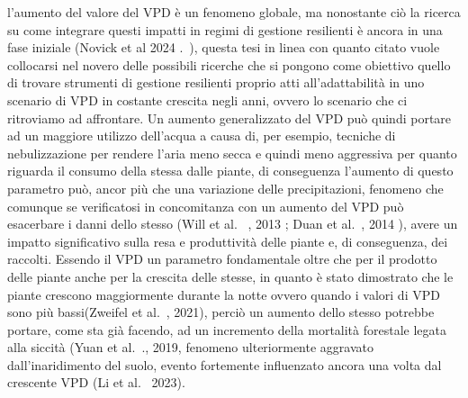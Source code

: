 l'aumento del valore del VPD è un fenomeno globale, ma nonostante ciò la ricerca su come integrare questi impatti in regimi di gestione resilienti è ancora in una fase iniziale (Novick et al 2024 .~\cite{novick2024vpd}), questa tesi in linea con quanto citato vuole collocarsi nel novero delle possibili ricerche che si pongono come obiettivo quello di trovare strumenti di gestione resilienti proprio atti all'adattabilità in uno scenario di VPD in costante crescita negli anni, ovvero lo scenario che ci ritroviamo ad affrontare. Un aumento generalizzato del VPD può quindi portare ad un maggiore utilizzo dell'acqua a causa di, per esempio, tecniche di nebulizzazione per rendere l'aria meno secca e quindi meno aggressiva per quanto riguarda il consumo della stessa dalle piante, di conseguenza l'aumento di questo parametro può, ancor più che una variazione delle precipitazioni, fenomeno che comunque se verificatosi in concomitanza con un aumento del VPD può esacerbare i danni dello stesso (Will et al.~\cite{will2013vulnerability} , 2013 ; Duan et al.~\cite{duan2014elevated}, 2014 ), avere un impatto significativo sulla resa e produttività delle piante e, di conseguenza, dei raccolti. Essendo il VPD un parametro fondamentale oltre che per il prodotto delle piante anche per la crescita delle stesse, in quanto è stato dimostrato che le piante crescono maggiormente durante la notte ovvero quando i valori di VPD sono più bassi(Zweifel et al.~\cite{zweifel2021night},  2021), perciò un aumento dello stesso potrebbe portare, come sta già facendo, ad un incremento della mortalità forestale legata alla siccità (Yuan et al.~\cite{yuan2019global}., 2019, fenomeno ulteriormente aggravato dall'inaridimento del suolo, evento fortemente influenzato ancora una volta dal crescente VPD (Li et al.~\cite{li2023soil}  2023). \\
